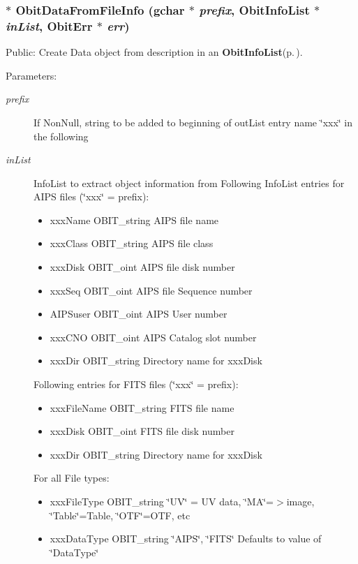 \subsubsection{$\ast$ Obit\-Data\-From\-File\-Info (gchar $\ast$ {\em prefix}, {\bf Obit\-Info\-List} $\ast$ {\em in\-List}, {\bf Obit\-Err} $\ast$ {\em err})}\label{ObitData_8c_a30}


Public: Create Data object from description in an {\bf Obit\-Info\-List}{\rm (p.\,\pageref{structObitInfoList})}. 

\begin{Desc}
\item[Parameters:]
\begin{description}
\item[{\em prefix}]If Non\-Null, string to be added to beginning of out\-List entry name \char`\"{}xxx\char`\"{} in the following \item[{\em in\-List}]Info\-List to extract object information from Following Info\-List entries for AIPS files (\char`\"{}xxx\char`\"{} = prefix): \begin{itemize}
\item xxx\-Name OBIT\_\-string AIPS file name \item xxx\-Class OBIT\_\-string AIPS file class \item xxx\-Disk OBIT\_\-oint AIPS file disk number \item xxx\-Seq OBIT\_\-oint AIPS file Sequence number \item AIPSuser OBIT\_\-oint AIPS User number \item xxx\-CNO OBIT\_\-oint AIPS Catalog slot number \item xxx\-Dir OBIT\_\-string Directory name for xxx\-Disk\end{itemize}
Following entries for FITS files (\char`\"{}xxx\char`\"{} = prefix): \begin{itemize}
\item xxx\-File\-Name OBIT\_\-string FITS file name \item xxx\-Disk OBIT\_\-oint FITS file disk number \item xxx\-Dir OBIT\_\-string Directory name for xxx\-Disk\end{itemize}
For all File types: \begin{itemize}
\item xxx\-File\-Type OBIT\_\-string \char`\"{}UV\char`\"{} = UV data, \char`\"{}MA\char`\"{}=$>$image, \char`\"{}Table\char`\"{}=Table, \char`\"{}OTF\char`\"{}=OTF, etc \item xxx\-Data\-Type OBIT\_\-string \char`\"{}AIPS\char`\"{}, \char`\"{}FITS\char`\"{} Defaults to value of \char`\"{}Data\-Type\char`\"{}\end{itemize}

\end{description}
\end{Desc}
